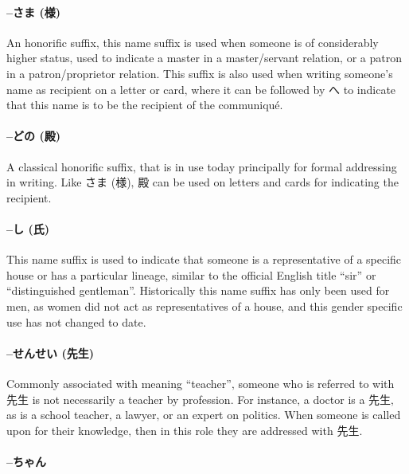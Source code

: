 \documentclass[11pt, b5paper, twoside, openright, onecolumn]{book}
\makeatletter
\newcommand*{\rubystack}[2]{{\relscale{0.5}%
  \begin{tabular}[b]{@{}c@{}}%
    {#1}\\%
   {\textscale{2}{#2}}%
  \end{tabular}}%
}
\DeclareRobustCommand*{\ruby}[2]{%
  \mbox{%
    \setlength{\parskip}{0ex}%
    \BeginAccSupp{method=pdfstringdef,ActualText={#1}}%
      \rubystack{\phantom{#2}}{#1}%
      \llap{%
        \rubystack{#2}{\phantom{#1}}%
      }%
    \EndAccSupp{}%
  }%
}
\renewcommand*{\ruby}[2]{#2 (#1)}%
\makeatother
\begin{document}
\paragraph{–\ruby{様}{さま}}

An honorific suffix‚ this name suffix is used when someone is of considerably higher status‚ used to indicate a master in a master/servant relation‚ or a patron in a patron/proprietor relation. This suffix is also used when writing someone’s name as recipient on a letter or card‚ where it can be followed by へ to indicate that this name is to be the recipient of the communiqué.

\paragraph{–\ruby{殿}{どの}}

A classical honorific suffix‚ that is in use today principally for formal addressing in writing. Like  \ruby{様}{さま}‚  殿 can be used on letters and cards for indicating the recipient.

\paragraph{–\ruby{氏}{し}}

This name suffix is used to indicate that someone is a representative of a specific house or has a particular lineage‚ similar  to the official English title “sir” or “distinguished gentleman”. Historically this name suffix has only been used for men‚ as women did not act as representatives of a house‚ and this gender specific use has not changed to date.

\paragraph{–\ruby{先生}{せんせい}}

Commonly associated with meaning “teacher”‚ someone who is referred to with 先生 is not necessarily a teacher by profession. For instance‚ a doctor is a 先生‚ as is a school teacher‚ a lawyer‚ or an expert on politics. When someone is called upon for their knowledge‚ then in this role they are addressed with 先生.

\paragraph{–ちゃん}
\end{document}
